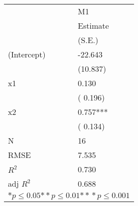 \begin{tabular}{*{2}{l}}
\hline
                  & M1   \tabularnewline
                   &Estimate \tabularnewline
                 &(S.E.) \tabularnewline
 \hline
 \hline
   (Intercept)     &-22.643 \tabularnewline
                 &(10.837)  \tabularnewline
   x1              &0.130 \tabularnewline
                 &( 0.196)  \tabularnewline
   x2              &0.757*** \tabularnewline
                 &( 0.134)  \tabularnewline
 \hline
 N                 &16       \tabularnewline
 RMSE             &7.535   \tabularnewline
 $R^2$             &0.730   \tabularnewline
 adj $R^2$         &0.688   \tabularnewline
 \hline
\hline
 
 \multicolumn{2}{c}{${*  p}\le 0.05$${*\!\!*  p}\le 0.01$${*\!\!*\!\!*  p}\le 0.001$}\tabularnewline
 \end{tabular}